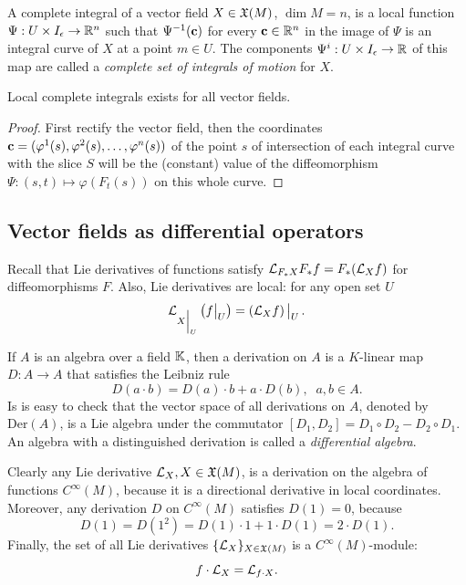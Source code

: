 \begin{defn}\label{def complete integral}
    A complete integral of a vector field $X\in \fX(M)$, $\dim M=n$, is a local function $\Psi:U\times I_\epsilon\to\bbR^n$ such that $\Psi^{-1}(\bf{c})$ for every $\bf{c}\in\bbR^n$ in the image of $\Psi$ is an integral curve of $X$ at a point $m\in U$. The components $\Psi^i:U\times I_\epsilon\to \bbR$ of this map are called a \emph{complete set of integrals of motion} for $X$.
\end{defn}
\begin{prop}
    Local complete integrals exists for all vector fields.
\end{prop}
\begin{proof}
    First rectify the vector field, then the coordinates $\bf{c}=(\varphi^1(s),\varphi^2(s),\ldots,\varphi^n(s))$ of the point $s$ of intersection of each integral curve with the slice $S$ will be the (constant) value of the diffeomorphism $\Psi:(s,t)\mapsto \varphi(F_t(s))$ on this whole curve.
\end{proof}




\subsection{Vector fields as differential operators}

Recall that Lie derivatives of functions satisfy $\Lie_{F_\ast X}F_\ast f=F_\ast(\Lie_X f)$ for diffeomorphisms $F$. Also, Lie derivatives are local: for any open set $U$
\[\Lie_{\restr{X}{U}}\left(\restr{f}{U}\right)=\restr{\left(\Lie_X f\right)}{U}.\]

\begin{defn}[Derivations]
If $A$ is an algebra over a field $\bbK$, then a derivation on $A$ is a $K$-linear map $D:A\to A$ that satisfies the Leibniz rule
\[D(a\cdot b)=D(a)\cdot b+a\cdot D(b),\;\; a,b\in A.\]
Is is easy to check that the vector space of all derivations on $A$, denoted by $\mathrm{Der}(A)$, is a Lie algebra under the commutator $[D_1,D_2]=D_1\circ D_2-D_2\circ D_1$.
An algebra with a distinguished derivation is called a \emph{differential algebra}.
\end{defn}

Clearly any Lie derivative $\Lie_X, X\in\fX(M)$, is a derivation on the algebra of functions $C^\infty(M)$, because it is a directional derivative in local coordinates.
Moreover, any derivation $D$ on $C^\infty(M)$ satisfies $D(1)=0$, because
\[D(1)=D(1^2)=D(1)\cdot 1+1\cdot D(1)=2\cdot D(1).\]
Finally, the set of all Lie derivatives $\{\Lie_X\}_{X\in\fX(M)}$ is a $C^\infty(M)$-module:
\[f\cdot\Lie_X=\Lie_{f\cdot X}.\]

